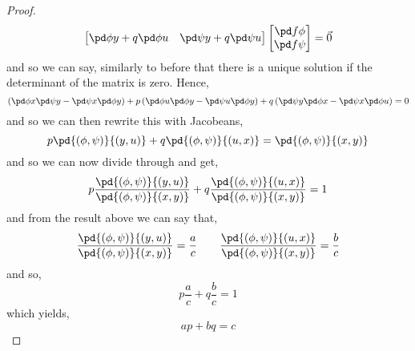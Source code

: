 \begin{proof}
$$\begin{bmatrix}
    \pd \phi y + q\pd \phi u & \pd \psi y + q\pd \psi u
  \end{bmatrix} \begin{bmatrix}
    \pd f \phi \\ \pd f \psi
  \end{bmatrix} = \vec 0$$
  and so we can say, similarly to before that there is a unique solution if the determinant of the matrix is zero. Hence,
  $$ \left(\pd \phi x\pd \psi y - \pd \psi x\pd \phi y\right) + p\left(\pd \phi u\pd \phi y - \pd \psi u\pd \phi y\right) + q\left(\pd \psi y\pd \phi x - \pd \psi x \pd \phi u \right) = 0 $$
  and so we can then rewrite this with Jacobeans,
  $$ p\pd{(\phi, \psi)}{(y, u)} + q\pd{(\phi, \psi)}{(u, x)} = \pd{(\phi, \psi)}{(x, y)} $$
  and so we can now divide through and get,
  $$ p\frac{\pd{(\phi, \psi)}{(y, u)}}{\pd{(\phi, \psi)}{(x, y)}} + q\frac{\pd{(\phi, \psi)}{(u, x)}}{\pd{(\phi, \psi)}{(x, y)}} = 1$$
  and from the result above we can say that,
  $$ \frac{\pd{(\phi, \psi)}{(y, u)}}{\pd{(\phi, \psi)}{(x, y)}} = \frac{a}{c} \qquad \frac{\pd{(\phi, \psi)}{(u, x)}}{\pd{(\phi, \psi)}{(x, y)}} = \frac{b}{c} $$
  and so,
  $$ p \frac{a}{c} + q \frac{b}{c} = 1 $$
  which yields,
  $$ ap + bq = c $$
\end{proof}